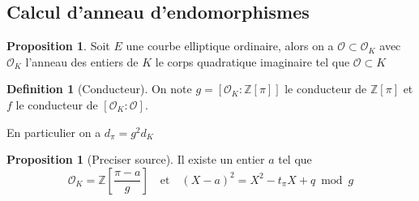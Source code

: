 \documentclass[10pt,a4paper]{beamer}
\theoremstyle{plain}
\theoremstyle{definition}
\theoremstyle{definition}
\theoremstyle{definition}
\newtheorem{prop}[thm]{Proposition}
\theoremstyle{definition}
\newtheorem{defi}[thm]{Definition}
\theoremstyle{remark}
\theoremstyle{remark}
\begin{document}

\begin{frame}
\section{Calcul d'anneau d'endomorphismes}

\begin{prop}
Soit $E$ une courbe elliptique ordinaire, alors on a $\mathcal{O} \subset \mathcal{O}_K$ avec $\mathcal{O}_K$ l'anneau des entiers de $K$ le corps quadratique imaginaire tel que $\mathcal{O} \subset K$
\end{prop}

\begin{defi}[Conducteur]
On note $g=[\mathcal{O}_K:\mathbb{Z}[\pi]]$ le conducteur de $\mathbb{Z}[\pi]$ et $f$ le conducteur de $[\mathcal{O}_K:\mathcal{O}]$.
\end{defi}
En particulier on a $d_{\pi}=g^2d_K$

\begin{prop}[Preciser source]
Il existe un entier $a$ tel que \[\mathcal{O}_K=\mathbb{Z} \left[ \frac{\pi-a}{g} \right] \quad \text{et} \quad (X-a)^2=X^2-t_{\pi}X+q \bmod g \]
\end{prop}

\end{frame}
\end{document}
